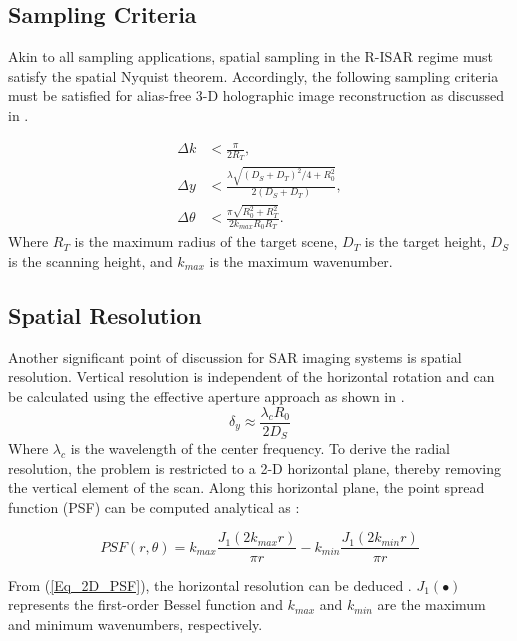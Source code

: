 \documentclass[conference]{IEEEtran}
\begin{document}
		\subsection{Sampling Criteria}
		Akin to all sampling applications, spatial sampling in the R-ISAR regime must satisfy the spatial Nyquist theorem. Accordingly, the following sampling criteria must be satisfied for alias-free 3-D holographic image reconstruction as discussed in \cite{Gao:EfficientAlgorithmMIMOCylindrical,Sheen:CSARPatent,Zhuge:ConcealedWeaponDectection,Vaupel:Sampling}.
		
		\begin{align}
			\Delta k &< \frac{\pi}{2R_T}, \\
			\Delta y &< \frac{\lambda \sqrt{(D_S + D_T)^2 /4 + R_0^2}}{2(D_S + D_T)}, \\
			\Delta \theta &< \frac{\pi \sqrt{R_0^2 + R_T^2}}{2k_{max}R_0R_T}.
		\end{align}
		Where $R_T$ is the maximum radius of the target scene, $D_T$ is the target height, $D_S$ is the scanning height, and $k_{max}$ is the maximum wavenumber. 
		
		
		\subsection{Spatial Resolution}
		Another significant point of discussion for SAR imaging systems is spatial resolution. Vertical resolution is independent of the horizontal rotation and can be calculated using the effective aperture approach as shown in \cite{Zhuge:ConcealedWeaponDectection}. 
		\begin{equation}
			\delta_y \approx \frac{\lambda_c R_0}{2D_S}
		\end{equation}
		Where $\lambda_c$ is the wavelength of the center frequency. 
		To derive the radial resolution, the problem is restricted to a 2-D horizontal plane, thereby removing the vertical element of the scan. Along this horizontal plane, the point spread function (PSF) can be computed analytical as \cite{Gao:THzWideAngleImaging_containsPSF}:
		
		\begin{equation}
			\label{Eq_2D_PSF}
			PSF(r,\theta) = k_{max} \frac{J_1(2k_{max}r)}{\pi r} - k_{min} \frac{J_1(2k_{min}r)}{\pi r}
		\end{equation}
		
		From (\ref{Eq_2D_PSF}), the horizontal resolution can be deduced \cite{Ishimaru:PSF_deduction}. $J_1(\bullet)$ represents the first-order Bessel function and $k_{max}$ and $k_{min}$ are the maximum and minimum wavenumbers, respectively. 
		
\end{document}
